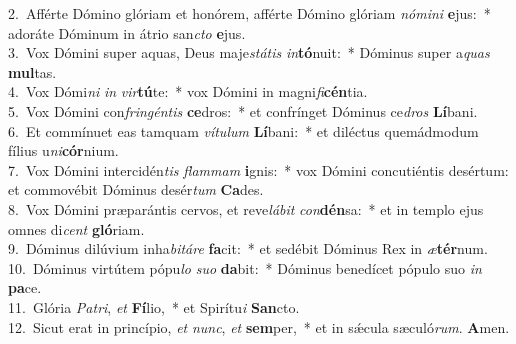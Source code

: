 {2.~}Afférte Dómino glóriam et honórem, afférte Dómino glóriam \textit{nó}\textit{mi}\textit{ni} \textbf{e}jus:~* adoráte Dóminum in átrio san\textit{cto} \textbf{e}jus.\\
{3.~}Vox Dómini super aquas, Deus maje\textit{stá}\textit{tis} \textit{in}\textbf{tó}nuit:~* Dóminus super a\textit{quas} \textbf{mul}tas.\\
{4.~}Vox Dómi\textit{ni} \textit{in} \textit{vir}\textbf{tú}te:~* vox Dómini in magni\textit{fi}\textbf{cén}tia.\\
{5.~}Vox Dómini con\textit{frin}\textit{gén}\textit{tis} \textbf{ce}dros:~* et confrínget Dóminus ce\textit{dros} \textbf{Lí}bani.\\
{6.~}Et commínuet eas tamquam \textit{ví}\textit{tu}\textit{lum} \textbf{Lí}bani:~* et diléctus quemádmodum fílius u\textit{ni}\textbf{cór}nium.\\
{7.~}Vox Dómini intercidén\textit{tis} \textit{flam}\textit{mam} \textbf{i}gnis:~* vox Dómini concutiéntis desértum: et commovébit Dóminus desér\textit{tum} \textbf{Ca}des.\\
{8.~}Vox Dómini præparántis cervos, et reve\textit{lá}\textit{bit} \textit{con}\textbf{dén}sa:~* et in templo ejus omnes di\textit{cent} \textbf{gló}riam.\\
{9.~}Dóminus dilúvium inha\textit{bi}\textit{tá}\textit{re} \textbf{fa}cit:~* et sedébit Dóminus Rex in \textit{æ}\textbf{tér}num.\\
{10.~}Dóminus virtútem pópu\textit{lo} \textit{su}\textit{o} \textbf{da}bit:~* Dóminus benedícet pópulo suo \textit{in} \textbf{pa}ce.\\
{11.~}Glória \textit{Pa}\textit{tri}, \textit{et} \textbf{Fí}lio,~* et Spirítu\textit{i} \textbf{San}cto.\\
{12.~}Sicut erat in princípio, \textit{et} \textit{nunc}, \textit{et} \textbf{sem}per,~* et in sǽcula sæculó\textit{rum}. \textbf{A}men.\\
